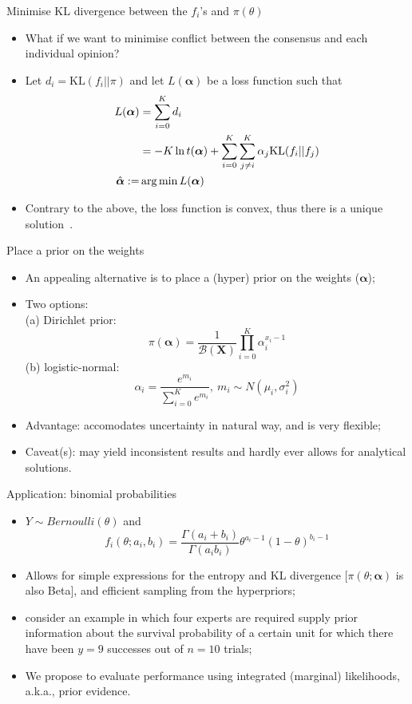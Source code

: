 \begin{frame}{Minimise KL divergence between the $f_i$'s and $\pi(\theta)$}
\begin{itemize}
 \item What if we want to minimise conflict between the consensus and each individual opinion?
 \item Let $d_i = \text{KL}(f_i || \pi)$ and let $L(\boldsymbol\alpha)$ be a loss function such that
\begin{align*}
L(\boldsymbol\alpha) &= \sum_{i=0}^Kd_i \\
     &= -K\ln t(\boldsymbol\alpha) + \sum_{i=0}^K\sum_{j\neq i}^K\alpha_j\text{KL}(f_i||f_j) \\
     \hat{\boldsymbol\alpha}:=& \operatorname*{arg\,min} L(\boldsymbol\alpha)   
\end{align*}
\item Contrary to the above, the loss function is convex, thus there is a unique solution~\citep{rufo2012A}.
\end{itemize}
\end{frame}
\begin{frame}{Place a prior on the weights}
 \begin{itemize}
  \item An appealing alternative is to place a (hyper) prior on the weights ($\boldsymbol\alpha$);
  \item Two options:\\
 (a) Dirichlet prior:
\[ \pi(\boldsymbol\alpha) = \frac{1}{\mathcal{B}(\boldsymbol X)}\prod_{i=0}^K \alpha_i^{x_i-1}\]
 (b) logistic-normal:
 \[\alpha_i = \frac{e^{m_i}}{\sum_{i=0}^{K} e^{m_i}}, \: m_i \sim N(\mu_i, \sigma_i^2)\]
 \item Advantage: accomodates uncertainty in natural way, and is very flexible;
 \item Caveat(s): may yield inconsistent results and hardly ever allows for analytical solutions.
 \end{itemize}
\end{frame}
\begin{frame}{Application: binomial probabilities}
 \begin{itemize}
  \item $Y\sim Bernoulli(\theta)$ and
  \[f_i(\theta;a_i, b_i) = \frac{\Gamma(a_i + b_i)}{\Gamma(a_i b_i)} \theta^{a_i-1}(1-\theta)^{b_i-1}\]
  \item Allows for simple expressions for the entropy and KL divergence [$\pi(\theta; \boldsymbol\alpha)$ is also Beta], and efficient sampling from the hyperpriors;
  \item \cite{savchuk1994} consider an example in which four experts are required supply prior information about the survival probability of
a certain unit for which there have been $y = 9$ successes out of $n = 10$ trials;
  \item We propose to evaluate performance using integrated (marginal) likelihoods, a.k.a., prior evidence.
 \end{itemize}
\end{frame}
